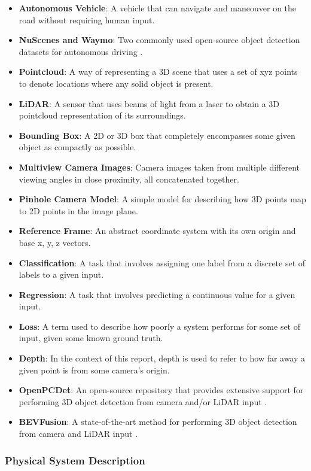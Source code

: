 \documentclass[12pt]{article}
\begin{document}
\begin{itemize}
\item \textbf{Autonomous Vehicle}: A vehicle that can navigate and maneouver on the road without requiring human input.
\item \textbf{NuScenes and Waymo}: Two commonly used open-source object detection datasets for autonomous driving \cite{caesar2020nuscenes} \cite{sun2020scalability}.
\item \textbf{Pointcloud}: A way of representing a 3D scene that uses a set of xyz points to denote locations where any solid object is present.
\item \textbf{LiDAR}: A sensor that uses beams of light from a laser to obtain a 3D pointcloud representation of its surroundings.
\item \textbf{Bounding Box}: A 2D or 3D box that completely encompasses some given object as compactly as possible.
\item \textbf{Multiview Camera Images}: Camera images taken from multiple different viewing angles in close proximity, all concatenated together.
\item \textbf{Pinhole Camera Model}: A simple model for describing how 3D points map to 2D points in the image plane.
\item \textbf{Reference Frame}: An abstract coordinate system with its own origin and base x, y, z vectors.
\item \textbf{Classification}: A task that involves assigning one label from a discrete set of labels to a given input.
\item \textbf{Regression}: A task that involves predicting a continuous value for a given input.
\item \textbf{Loss}: A term used to describe how poorly a system performs for some set of input, given some known ground truth.
\item \textbf{Depth}: In the context of this report, depth is used to refer to how far away a given point is from some camera's origin.
\item \textbf{OpenPCDet}: An open-source repository that provides extensive support for performing 3D object detection from camera and/or LiDAR input \cite{openpcdet2020}.
\item \textbf{BEVFusion}: A state-of-the-art method for performing 3D object detection from camera and LiDAR input \cite{liang2022bevfusion}.
\end{itemize}

\subsubsection{Physical System Description} \label{sec_phySystDescrip}
\end{document}
